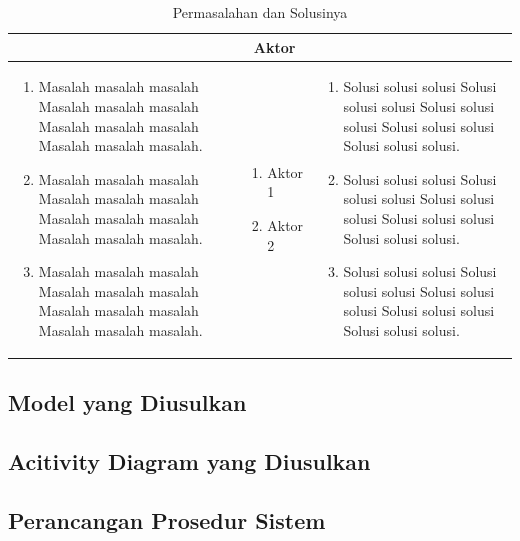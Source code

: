 \begin{table}[ht]
\centering
\caption{Permasalahan dan Solusinya}
\begin{tabular}{|>{\raggedright}p{5cm}|p{2.5cm}|>{\raggedright}p{5cm}|}
 \hline
 \multicolumn{1}{|c}{\bfseries Masalah} & \multicolumn{1}{|c|}{\bfseries Aktor} & \multicolumn{1}{c|}{\bfseries Solusi} \\ 
  \hline
\begin{enumerate}
   	\item Masalah masalah masalah Masalah masalah masalah Masalah masalah masalah Masalah masalah masalah.
   	\item Masalah masalah masalah Masalah masalah masalah Masalah masalah masalah Masalah masalah masalah.
   	\item Masalah masalah masalah Masalah masalah masalah Masalah masalah masalah Masalah masalah masalah.
   \end{enumerate} &
   \begin{enumerate}
  	\item Aktor 1
  	\item Aktor 2
  \end{enumerate} &
  \begin{enumerate}
  \item Solusi solusi solusi Solusi solusi solusi Solusi solusi solusi Solusi solusi solusi Solusi solusi solusi.
  \item Solusi solusi solusi Solusi solusi solusi Solusi solusi solusi Solusi solusi solusi Solusi solusi solusi.
  \item Solusi solusi solusi Solusi solusi solusi Solusi solusi solusi Solusi solusi solusi Solusi solusi solusi.
  \end{enumerate}
     \tabularnewline
  \hline
 \end{tabular}
\end{table}

\subsection{Model yang Diusulkan}

\subsection{Acitivity Diagram yang Diusulkan}

\subsection{Perancangan Prosedur Sistem}

